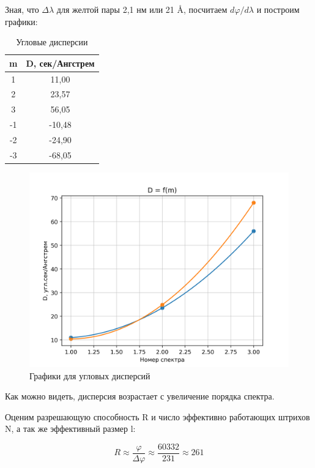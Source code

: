 \documentclass[a4paper, 12pt]{article}
\begin{document}
Зная, что $\Delta\lambda$ для желтой пары 2,1 нм или 21 \r{A}, посчитаем $d\varphi/d\lambda$ и построим графики:

\begin{table}[H]
	\centering
	\begin{tabular}{|c|c|}
	\hline
	\textbf{m} & \textbf{D, сек/Ангстрем} \\ \hline
	1          & 11,00                    \\ \hline
	2          & 23,57                    \\ \hline
	3          & 56,05                    \\ \hline
	-1         & -10,48                   \\ \hline
	-2         & -24,90                   \\ \hline
	-3         & -68,05                   \\ \hline
	\end{tabular}
	\caption{Угловые дисперсии}
	\label{tab:data_4}
\end{table}

\begin{figure}[H]
    \centering
    \includegraphics[width=1\textwidth]{plot2.png}
    \caption{Графики для угловых дисперсий}
    \label{fig:plot2}
\end{figure}

Как можно видеть, дисперсия возрастает с увеличение порядка спектра.

Оценим разрешающую способность R и число эффективно работающих штрихов N, а так же эффективный размер l:

\begin{equation*}
	R \approx \frac{\varphi}{\Delta\varphi} \approx \frac{60332}{231} \approx 261
\end{equation*}
\end{document}
